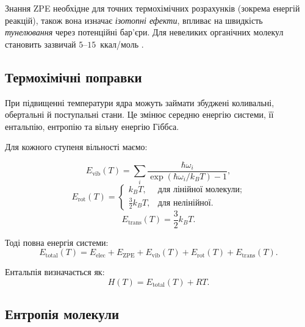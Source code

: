 Знання ZPE необхідне для точних термохімічних розрахунків (зокрема енергій реакцій), також вона изначає \emph{ізотопні ефекти}, впливає на швидкість \emph{тунелювання} через потенційні бар’єри. Для невеликих органічних молекул становить зазвичай $5$–$15$~ккал/моль .


\subsection{Термохімічні поправки}

При підвищенні температури ядра можуть займати збуджені коливальні,
обертальні й поступальні стани. Це змінює середню енергію системи,
її ентальпію, ентропію та вільну енергію Гіббса.

Для кожного ступеня вільності маємо:

\begin{equation*}
    E_{\text{vib}}(T) = \sum_i \frac{\hbar\omega_i}{\exp(\hbar\omega_i/k_BT) - 1},
\end{equation*}
\begin{equation*}
    E_{\text{rot}}(T) =
    \begin{cases}
        k_BT, & \text{для лінійної молекули;} \\
        \frac{3}{2}k_BT, & \text{для нелінійної.}
    \end{cases}
\end{equation*}
\begin{equation*}
    E_{\text{trans}}(T) = \frac{3}{2}k_BT.
\end{equation*}

Тоді повна енергія системи:
\begin{equation*}
    E_{\text{total}}(T) = E_{\text{elec}} + E_{\text{ZPE}} + E_{\text{vib}}(T)
    + E_{\text{rot}}(T) + E_{\text{trans}}(T).
\end{equation*}

Ентальпія визначається як:
\begin{equation*}
    H(T) = E_{\text{total}}(T) + RT.
\end{equation*}

\subsection{Ентропія молекули}

